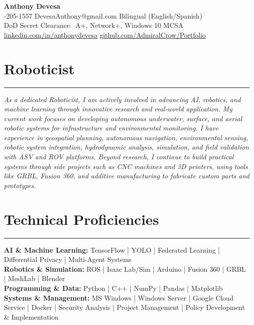 \documentclass[10pt,letterpaper]{article}
\newcommand{\sectionrule}{\vspace{-2pt}\hrule\vspace{4pt}}
\begin{document}
\begin{center}
{\LARGE \bfseries Anthony Devesa}\\[2pt]
\fontsize{9}{11}-205-1557 \quad DevesaAnthony@gmail.com \quad \textbullet\quad Bilingual (English/Spanish)\\
DoD Secret Clearance \textbullet\ A+, Network+, Windows 10 MCSA\\
\href{https://www.linkedin.com/in/anthonydevesa/}{linkedin.com/in/anthonydevesa} \quad \textbullet\quad
\href{https://github.com/AdmiralCrow/Portfolio}{github.com/AdmiralCrow/Portfolio}
\end{center}

\vspace{-2pt}
\section{Roboticist}
\sectionrule
\fontsize{9}{11}\selectfont
\textit{As a dedicated Roboticist, I am actively involved in advancing AI, robotics, and machine learning
through innovative research and real-world application. My current work focuses on developing autonomous
underwater, surface, and aerial robotic systems for infrastructure and environmental monitoring. I have
experience in geospatial planning, autonomous navigation, environmental sensing, robotic system integration,
hydrodynamic analysis, simulation, and field validation with ASV and ROV platforms. Beyond research, I
continue to build practical systems through side projects such as CNC machines and 3D printers, using tools
like GRBL, Fusion 360, and additive manufacturing to fabricate custom parts and prototypes.}

\section{Technical Proficiencies}
\sectionrule
\fontsize{9}{12}\selectfont
\textbf{AI \& Machine Learning:} TensorFlow | YOLO | Federated Learning | Differential Privacy | Multi-Agent Systems\\
\textbf{Robotics \& Simulation:} ROS | Isaac Lab/Sim | Arduino | Fusion 360 | GRBL | MeshLab | Blender\\
\textbf{Programming \& Data:} Python | C++ | NumPy | Pandas | Matplotlib\\
\textbf{Systems \& Management:} MS Windows | Windows Server | Google Cloud Service | Docker | Security Analysis | Project Management | Policy Development \& Implementation
\end{document}
